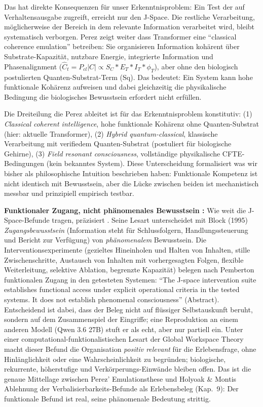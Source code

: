 \documentclass[acmlarge, noacm]{acmart}
\begin{document}
Das hat direkte Konsequenzen für unser Erkenntnisproblem: Ein Test der auf Verhaltensausgabe zugreift, erreicht nur den J-Space. Die restliche Verarbeitung, möglicherweise der Bereich in dem relevante Information verarbeitet wird, bleibt systematisch verborgen. Perez zeigt weiter dass Transformer eine ``classical coherence emulation'' betreiben: Sie organisieren Information kohärent über Substrate-Kapazität, nutzbare Energie, integrierte Information und Phasenalignment ($\hat{C}_t = P_{cl}|C| \propto S_C * E_T * I_T * \phi_T$), aber ohne den biologisch postulierten Quanten-Substrat-Term (Sq). Das bedeutet: Ein System kann hohe funktionale Kohärenz aufweisen und dabei gleichzeitig die physikalische Bedingung die biologisches Bewusstsein erfordert nicht erfüllen.

Die Dreiteilung die Perez ableitet ist für das Erkenntnisproblem konstitutiv: (1) \textit{Classical coherent intelligence}, hohe funktionale Kohärenz ohne Quanten-Substrat (hier: aktuelle Transformer), (2) \textit{Hybrid quantum-classical}, klassische Verarbeitung mit verifiedem Quanten-Substrat (postuliert für biologische Gehirne), (3) \textit{Field resonant consciousness}, vollständige physikalische CFTE-Bedingungen (kein bekanntes System). Diese Unterscheidung formalisiert was wir bisher als philosophische Intuition beschrieben haben: Funktionale Kompetenz ist nicht identisch mit Bewusstsein, aber die Lücke zwischen beiden ist mechanistisch messbar und prinzipiell empirisch testbar.

\textbf{Funktionaler Zugang, nicht phänomenales Bewusstsein \cite{pemberton2026}:} Wie weit die J-Space-Befunde \cite{gurnee2026} tragen, präzisiert \citet{pemberton2026}. Seine Lesart unterscheidet mit Block (1995) \cite{block1995} \textit{Zugangsbewusstsein} (Information steht für Schlussfolgern, Handlungssteuerung und Bericht zur Verfügung) von \textit{phänomenalem} Bewusstsein. Die Interventionsexperimente (gezieltes Hineinholen und Halten von Inhalten, stille Zwischenschritte, Austausch von Inhalten mit vorhergesagten Folgen, flexible Weiterleitung, selektive Ablation, begrenzte Kapazität) belegen nach Pemberton funktionalen Zugang in den getesteten Systemen: ``The J-space intervention suite establishes functional access under explicit operational criteria in the tested systems. It does not establish phenomenal consciousness'' (Abstract). Entscheidend ist dabei, dass der Beleg nicht auf flüssiger Selbstauskunft beruht, sondern auf dem Zusammenspiel der Eingriffe; eine Reproduktion an einem anderen Modell (Qwen 3.6 27B) stuft er als echt, aber nur partiell ein. Unter einer computational-funktionalistischen Lesart der Global Workspace Theory macht dieser Befund die Organisation \textit{positiv relevant} für die Erlebensfrage, ohne Hinlänglichkeit oder eine Wahrscheinlichkeit zu begründen; biologische, rekurrente, höherstufige und Verkörperungs-Einwände bleiben offen. Das ist die genaue Mittellage zwischen Perez' Emulationsthese und Holyoak \& Montis Ablehnung der Verbalisierbarkeits-Befunde als Erlebensbeleg (Kap.~9): Der funktionale Befund ist real, seine phänomenale Bedeutung strittig.
\end{document}
